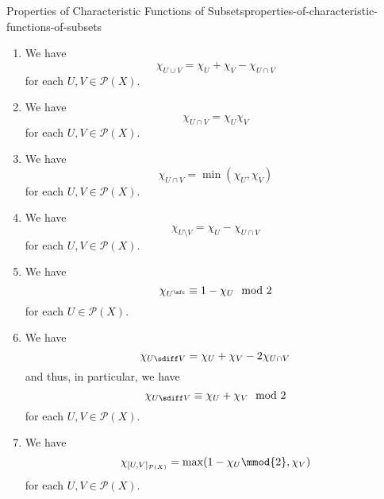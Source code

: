 \begin{proposition}{Properties of Characteristic Functions of Subsets}{properties-of-characteristic-functions-of-subsets}
\begin{enumerate}
\[                =%
                \max(\chi_{U},\chi_{V})%
            \]%
            for each $U,V\in\mathcal{P}(X)$.
        \item\label{properties-of-characteristic-functions-of-subsets-interaction-with-unions-2}We have
            \[
                \chi_{U\cup V}%
                =%
                \chi_{U}+\chi_{V}-\chi_{U\cap V}%
            \]%
            for each $U,V\in\mathcal{P}(X)$.
        \item\label{properties-of-characteristic-functions-of-subsets-interaction-with-intersections-1}We have
            \[
                \chi_{U\cap V}%
                =%
                \chi_{U}\chi_{V}%
            \]%
            for each $U,V\in\mathcal{P}(X)$.
        \item\label{properties-of-characteristic-functions-of-subsets-interaction-with-intersections-2}We have
            \[
                \chi_{U\cap V}%
                =%
                \min(\chi_{U},\chi_{V})%
            \]%
            for each $U,V\in\mathcal{P}(X)$.
        \item\label{properties-of-characteristic-functions-of-subsets-interaction-with-differences}We have
            \[
                \chi_{U\setminus V}%
                =%
                \chi_{U}%
                -%
                \chi_{U\cap V}%
            \]%
            for each $U,V\in\mathcal{P}(X)$.
        \item\label{properties-of-characteristic-functions-of-subsets-interaction-with-complements}We have
            \[
                \chi_{U^{\sfc}}%
                \equiv%
                1-\chi_{U}\mod{2}%
            \]%
            for each $U\in\mathcal{P}(X)$.
        \item\label{properties-of-characteristic-functions-of-subsets-interaction-with-symmetric-differences}We have
            \[
                \chi_{U\sdiff V}%
                =%
                \chi_{U}%
                +%
                \chi_{V}%
                -%
                2\chi_{U\cap V}%
            \]%
            and thus, in particular, we have
            \[
                \chi_{U\sdiff V}%
                \equiv%
                \chi_{U}+\chi_{V}%
                \mod{2}%
            \]%
            for each $U,V\in\mathcal{P}(X)$.
        \item\label{properties-of-characteristic-functions-of-subsets-interaction-with-internal-homs}We have
            \[
                \chi_{[U,V]_{\mathcal{P}(X)}}%
                =%
                \max(1-\chi_{U}\mmod{2},\chi_{V})
            \]%
            for each $U,V\in\mathcal{P}(X)$.
    \end{enumerate}
\end{proposition}

